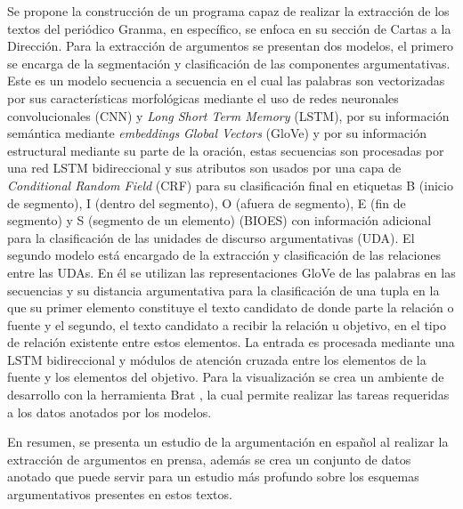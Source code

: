 \documentclass[a4paper,11pt,twocolumn,twoside]{article}
\begin{document}
Se propone la construcción de un programa capaz de realizar la extracción de los textos del periódico Granma, 
en específico, se enfoca en su sección de Cartas a la Dirección. Para la extracción
de argumentos se presentan dos modelos, el primero se encarga de la segmentación y clasificación
de las componentes argumentativas. Este es un modelo secuencia a secuencia en el cual las palabras 
son vectorizadas por sus características morfológicas mediante el uso de redes neuronales convolucionales
(CNN) y \textit{Long Short Term Memory} (LSTM), por su información
semántica mediante \textit{embeddings} \textit{Global Vectors} (GloVe) y por su información 
estructural mediante su parte de la oración, estas 
secuencias son procesadas por una red LSTM bidireccional y sus atributos son usados por una capa 
de \textit{Conditional Random Field} (CRF)
para su clasificación final en etiquetas B (inicio de segmento), I (dentro del segmento), O (afuera de segmento), 
E (fin de segmento) y S (segmento de un elemento) (BIOES) con información adicional para la clasificación de las 
unidades de discurso argumentativas (UDA). El segundo modelo está encargado de la extracción y clasificación 
de las relaciones entre las UDAs. En él se utilizan las representaciones GloVe de las palabras en las secuencias 
y su distancia argumentativa para la clasificación de una tupla en la que su primer elemento 
constituye el texto candidato de donde parte la relación o fuente y el segundo, el texto candidato a recibir la 
relación u objetivo, en el tipo de relación existente entre estos elementos. La entrada es procesada mediante 
una LSTM bidireccional y módulos de atención cruzada entre los elementos de la fuente y los elementos del objetivo.
Para la visualización se crea un ambiente de desarrollo con la herramienta Brat \cite{brat}, la cual permite realizar las 
tareas requeridas a los datos anotados por los modelos.

En resumen, se presenta un estudio de la argumentación en español al realizar la extracción de 
argumentos en prensa, además se crea un conjunto de datos anotado que puede servir
para un estudio más profundo sobre los esquemas argumentativos presentes en estos textos. 

\end{document}
